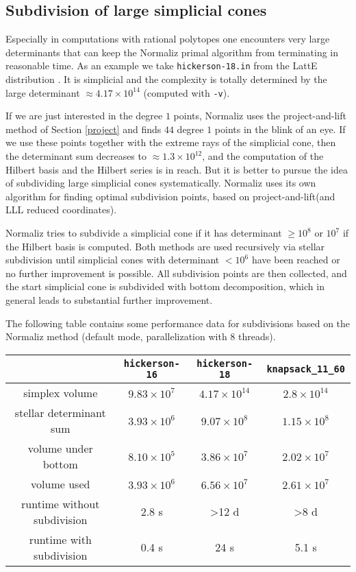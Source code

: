\documentclass[12pt,a4paper]{scrartcl}
\theoremstyle{definition}
\def\ttt{\texttt}
\begin{document}
{\subsection{Subdivision of large simplicial cones}\label{subdiv}

Especially in computations with rational polytopes one encounters very large determinants that can keep the Normaliz primal algorithm from terminating in reasonable time. As an example we take \verb|hickerson-18.in| from the LattE distribution \cite{LatInt}. It is simplicial and the complexity is totally determined by the large determinant $\approx 4.17\times 10^{14}$ (computed with \verb|-v|). 

If we are just interested in the degree $1$ points, Normaliz uses the project-and-lift method of Section \ref{project} and finds $44$ degree $1$ points in the blink of an eye. If we use these points together with the extreme rays of the simplicial cone, then the determinant sum decreases to $\approx 1.3\times 10^{12}$, and the computation of the Hilbert basis and the Hilbert series is in reach. But it is better to pursue the idea of subdividing large simplicial cones systematically. Normaliz 
uses its own algorithm for finding optimal subdivision points, based on project-and-lift(and LLL reduced coordinates).

Normaliz tries to subdivide a simplicial cone if it has determinant $\ge 10^8$ or $10^7$ if the Hilbert basis is computed. Both methods are used recursively via stellar subdivision until simplicial cones with determinant $< 10^6$ have been reached or no further improvement is possible. All subdivision points are then collected, and the start simplicial cone is subdivided with bottom decomposition, which in general leads to substantial further improvement.

The following table contains some performance data for subdivisions based on the Normaliz method (default mode, parallelization with 8 threads).
\begin{center}
\setlength{\tabcolsep}{3.2pt}
\renewcommand{\arraystretch}{1.2}
\begin{tabular}{|c|c|c|c|}
\hline
& \ttt{hickerson-16} & \ttt{hickerson-18} & \ttt{knapsack\_11\_60}  \\ \hline
simplex volume & $9.83\times 10^7$ & $4.17\times 10^{14}$ & $2.8\times 10^{14}$ \\ \hline
stellar determinant sum & $3.93\times 10^6$  & $9.07\times 10^8$  & $1.15\times 10^8$\\ \hline
volume under bottom  & $8.10\times 10^5$ & $3.86\times 10^7$ & $2.02\times 10^7$ \\ \hline 
volume used     & $3.93\times 10^6$ & $6.56\times 10^7$ & $2.61\times 10^7$ \\ \hline
runtime without subdivision   &  2.8 s & >12 d &  >8 d \\ \hline
runtime with subdivision    &  0.4 s & 24 s & 5.1 s \\ \hline
\end{tabular}
\end{center}

}
\end{document}
